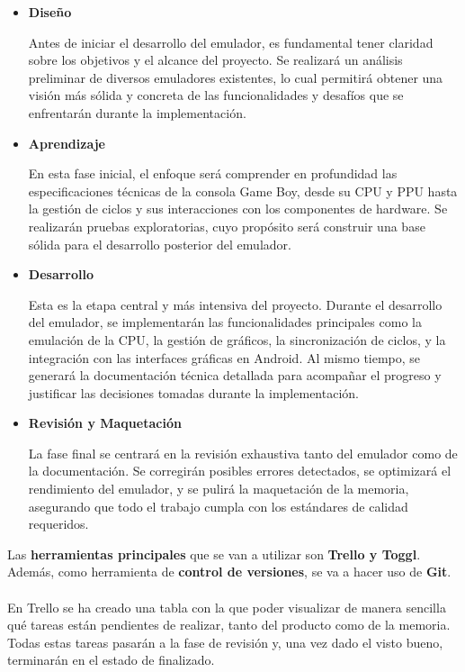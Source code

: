 \begin{itemize}
	\item \textbf{Diseño}
	
	Antes de iniciar el desarrollo del emulador, es fundamental tener claridad sobre los objetivos y el alcance del proyecto. Se realizará un análisis preliminar de diversos emuladores existentes, lo cual permitirá obtener una visión más sólida y concreta de las funcionalidades y desafíos que se enfrentarán durante la implementación.

	\item \textbf{Aprendizaje}
	
	En esta fase inicial, el enfoque será comprender en profundidad las especificaciones técnicas de la consola Game Boy, desde su CPU y PPU hasta la gestión de ciclos y sus interacciones con los componentes de hardware. Se realizarán pruebas exploratorias, cuyo propósito será construir una base sólida para el desarrollo posterior del emulador.
	
	\item \textbf{Desarrollo}
	
	Esta es la etapa central y más intensiva del proyecto. Durante el desarrollo del emulador, se implementarán las funcionalidades principales como la emulación de la CPU, la gestión de gráficos, la sincronización de ciclos, y la integración con las interfaces gráficas en Android. Al mismo tiempo, se generará la documentación técnica detallada para acompañar el progreso y justificar las decisiones tomadas durante la implementación.
	
	\item \textbf{Revisión y Maquetación}
	
	La fase final se centrará en la revisión exhaustiva tanto del emulador como de la documentación. Se corregirán posibles errores detectados, se optimizará el rendimiento del emulador, y se pulirá la maquetación de la memoria, asegurando que todo el trabajo cumpla con los estándares de calidad requeridos.
	
\end{itemize}

Las \textbf{herramientas principales} que se van a utilizar son \textbf{Trello y Toggl}. Además, como herramienta de \textbf{control de versiones}, se va a hacer uso de \textbf{Git}.
\\ \\
En Trello se ha creado una tabla con la que poder visualizar de manera sencilla qué tareas están pendientes de realizar, tanto del producto como de la memoria. Todas estas tareas pasarán a la fase de revisión y, una vez dado el visto bueno, terminarán en el estado de finalizado.

